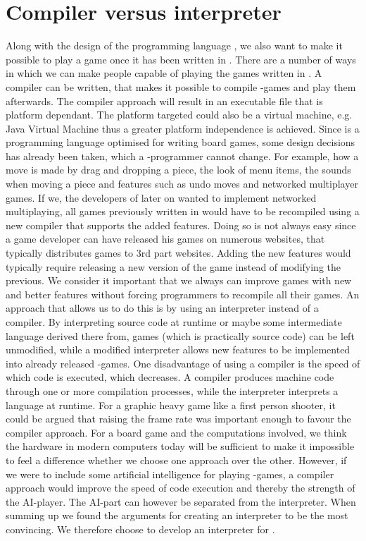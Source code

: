\section{Compiler versus interpreter}

Along with the design of the programming language \productname{}, we also want to make it possible to play a game once it has been written in \productname{}. There are a number of ways in which we can make people capable of playing the games written in \productname{}. A compiler can be written, that makes it possible to compile \productname{}-games and play them afterwards. The compiler approach will result in an executable file that is platform dependant. The platform targeted could also be a virtual machine, e.g. Java Virtual Machine thus a greater platform independence is achieved. Since \productname{} is a programming language optimised for writing board games, some design decisions has already been taken, which a \productname{}-programmer cannot change. For example, how a move is made by drag and dropping a piece, the look of menu items, the sounds when moving a piece and features such as undo moves and networked multiplayer games. If we, the developers of \productname{} later on wanted to implement networked multiplaying, all games previously written in \productname{} would have to be recompiled using a new compiler that supports the added features. Doing so is not always easy since a game developer can have released his games on numerous websites, that typically distributes games to 3rd part websites. Adding the new features would typically require releasing a new version of the game instead of modifying the previous. We consider it important that we always can improve games with new and better features without forcing programmers to recompile all their games. 
An approach that allows us to do this is by using an interpreter instead of a compiler. By interpreting \productname{} source code at runtime or maybe some intermediate language derived there from, games (which is practically source code) can be left unmodified, while a modified interpreter allows new features to be implemented into already released \productname{}-games.
One disadvantage of using a compiler is the speed of which code is executed, which decreases. A compiler produces machine code through one or more compilation processes, while the interpreter interprets a language at runtime. For a graphic heavy game like a first person shooter, it could be argued that raising the frame rate was important enough to favour the compiler approach. For a board game and the computations involved, we think the hardware in modern computers today will be sufficient to make it impossible to feel a difference whether we choose one approach over the other. However, if we were to include some artificial intelligence for playing \productname{}-games, a compiler approach would improve the speed of code execution and thereby the strength of the AI-player. The AI-part can however be separated from the interpreter. When summing up we found the arguments for creating an interpreter to be the most convincing. We therefore choose to develop an interpreter for \productname{}.
